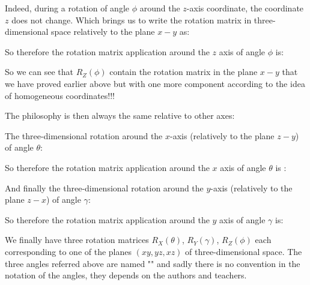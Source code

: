 	Indeed, during a rotation of angle $\phi$ around the $z$-axis coordinate, the coordinate $z$ does not change. Which brings us to write the rotation matrix in three-dimensional space relatively to the plane $x-y$ as:
	
	\begin{center}
	\centering
	\end{center}
	So therefore the rotation matrix application around the $z$ axis of angle $\phi$ is:
		
	 So we can see that $R_Z(\phi)$ contain the rotation matrix in the plane $x-y$ that we have proved earlier above but with one more component according to the idea of homogeneous coordinates!!!
	 
	 The philosophy is then always the same relative to other axes:
	 
	 The three-dimensional rotation around the $x$-axis (relatively to the plane $z-y$) of angle $\theta$:
	
	\begin{center}
	\centering
	\end{center}
	So therefore the rotation matrix application around the $x$ axis of angle $\theta$ is \label{3d rotation matrix around x}:
	
	 
	 And finally the three-dimensional rotation around the $y$-axis (relatively to the plane $z-x$) of angle $\gamma$:
	
	\begin{center}
	\centering
	\end{center}
	So therefore the rotation matrix application around the $y$ axis of angle $\gamma$ is:
	
	 We finally have three rotation matrices $R_X(\theta)$, $R_Y(\gamma)$, $R_Z(\phi)$ each corresponding to one of the planes $(xy,yz,xz)$ of three-dimensional space. The three angles referred above are named "" and sadly there is no convention in the notation of the angles, they depends on the authors and teachers.

